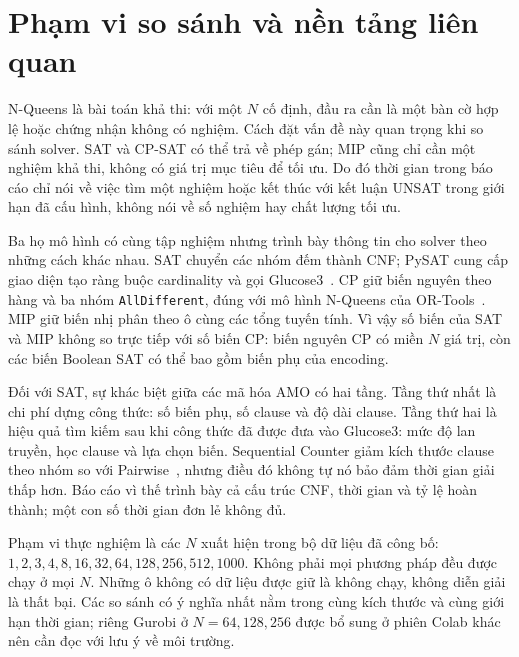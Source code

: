 \section{Phạm vi so sánh và nền tảng liên quan}

N-Queens là bài toán khả thi: với một $N$ cố định, đầu ra cần là một bàn cờ
hợp lệ hoặc chứng nhận không có nghiệm. Cách đặt vấn đề này quan trọng khi
so sánh solver. SAT và CP-SAT có thể trả về phép gán; MIP cũng chỉ cần một
nghiệm khả thi, không có giá trị mục tiêu để tối ưu. Do đó thời gian trong
báo cáo chỉ nói về việc tìm một nghiệm hoặc kết thúc với kết luận UNSAT trong
giới hạn đã cấu hình, không nói về số nghiệm hay chất lượng tối ưu.

Ba họ mô hình có cùng tập nghiệm nhưng trình bày thông tin cho solver theo
những cách khác nhau. SAT chuyển các nhóm đếm thành CNF; PySAT cung cấp
giao diện tạo ràng buộc cardinality và gọi Glucose3~\cite{pysat-paper,pysat-docs}.
CP giữ biến nguyên theo hàng và ba nhóm \texttt{AllDifferent}, đúng với mô
hình N-Queens của OR-Tools~\cite{ortools-nqueens}. MIP giữ biến nhị phân theo
ô cùng các tổng tuyến tính. Vì vậy số biến của SAT và MIP không so trực tiếp
với số biến CP: biến nguyên CP có miền $N$ giá trị, còn các biến Boolean SAT
có thể bao gồm biến phụ của encoding.

Đối với SAT, sự khác biệt giữa các mã hóa AMO có hai tầng. Tầng thứ nhất là
chi phí dựng công thức: số biến phụ, số clause và độ dài clause. Tầng thứ
hai là hiệu quả tìm kiếm sau khi công thức đã được đưa vào Glucose3: mức độ
lan truyền, học clause và lựa chọn biến. Sequential Counter giảm kích thước
clause theo nhóm so với Pairwise~\cite{sinz2005}, nhưng điều đó không tự nó
bảo đảm thời gian giải thấp hơn. Báo cáo vì thế trình bày cả cấu trúc CNF,
thời gian và tỷ lệ hoàn thành; một con số thời gian đơn lẻ không đủ.

Phạm vi thực nghiệm là các $N$ xuất hiện trong bộ dữ liệu đã công bố:
$1,2,3,4,8,16,32,64,128,256,512,1000$. Không phải mọi phương pháp đều
được chạy ở mọi $N$. Những ô không có dữ liệu được giữ là không chạy,
không diễn giải là thất bại. Các so sánh có ý nghĩa nhất nằm trong cùng
kích thước và cùng giới hạn thời gian; riêng Gurobi ở $N=64,128,256$ được
bổ sung ở phiên Colab khác nên cần đọc với lưu ý về môi trường.
